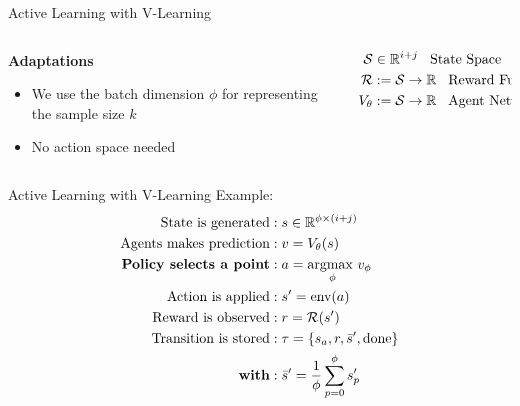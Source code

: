 \documentclass[aspectratio=169, 11pt, invertlogo]{ismll-slides}
\begin{document}

\begin{frame}[fragile]{Active Learning with V-Learning}
	\begin{columns}
		\begin{column}{.4\linewidth}
			\textbf{Adaptations}
			\begin{itemize}
				\item We use the batch dimension $\phi$ for representing the sample size $k$
				\item No action space needed
				
			\end{itemize}
		\end{column}
		\begin{column}{.4\linewidth}
			\begin{align*}
			\mathcal{S} &\in \mathbb{R}^{i+j} \hspace{3mm}\text{State Space} \\
			\mathcal{R} &:= \mathcal{S} \rightarrow \mathbb{R} \hspace{3mm}\text{Reward Function} \\
			V_\theta &:= \mathcal{S} \rightarrow \mathbb{R} \hspace{3mm}\text{Agent Network} \\
			\end{align*}
		\end{column}
	\end{columns}
\end{frame}



\begin{frame}[fragile]{Active Learning with V-Learning}
	Example:
	\begin{align*}
		\text{State is generated} &: s \in \mathbb{R}^{\phi \times (i+j)} \\
		\text{Agents makes prediction} &: v = V_\theta(s) \\
		\text{\textbf{Policy selects a point}} &: a = \underset{\phi}{\text{argmax }} v_{\phi} \\
		\text{Action is applied} &: s' = \text{env}(a) \\
		\text{Reward is observed} &: r = \mathcal{R}(s') \\
		\text{Transition is stored} &: \tau = \{ s_{a}, r, \bar s', \text{done} \} \\
		\text{\textbf{with}} &: \bar s' = \frac{1}{\phi} \sum\limits_{p=0}^\phi s'_{p}
	\end{align*}
\end{frame}
\end{document}
